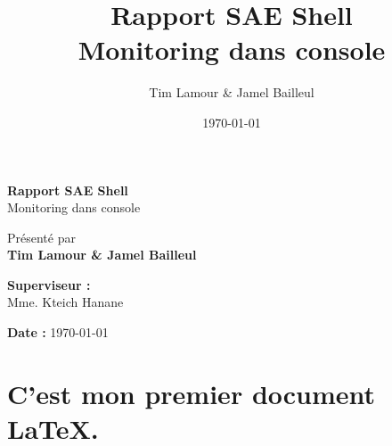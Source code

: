 \documentclass{report}
\title{\Huge \textbf{Rapport SAE Shell}\\\vspace{0.5cm} \Large Monitoring dans console}
\author{\Large Tim Lamour \& Jamel Bailleul}
\date{\today}
\begin{document}
\begin{titlepage}
    \begin{center}

        \vspace{1cm}
        \Huge \textbf{Rapport SAE Shell}\\
        \Large Monitoring dans console

        \vspace{1.5cm}
        \large
        Présenté par \\
        \textbf{Tim Lamour \& Jamel Bailleul}

        \vspace{2cm}
        \textbf{Superviseur :}\\
        Mme. Kteich Hanane

        \vfill

        \vspace{1cm}
        \large
        \textbf{Date :} \today
    \end{center}
\end{titlepage}

\newpage
\section{C'est mon premier document LaTeX.}

\lipsum[1] %
\end{document}
